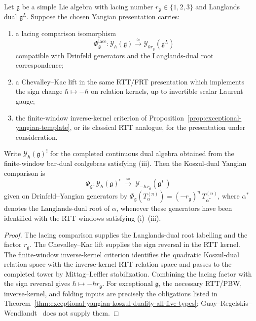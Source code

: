 \begin{theorem}
\label{thm:yangian-langlands-lacing}
Let $\mathfrak{g}$ be a simple Lie algebra with lacing number
$r_{\mathfrak{g}} \in \{1, 2, 3\}$ and Langlands dual $\mathfrak{g}^L$.
Suppose the chosen Yangian presentation carries:
\begin{enumerate}[label=\textup{(\roman*)}]
\item a lacing comparison isomorphism
\[
 \Phi_{\mathfrak{g}}^{\mathrm{lace}} :
 \mathcal{Y}_{\hbar}(\mathfrak{g})
 \xrightarrow{\;\simeq\;}
 \mathcal{Y}_{\hbar r_{\mathfrak{g}}}(\mathfrak{g}^L)
\]
compatible with Drinfeld generators and the Langlands-dual root
correspondence;
\item a Chevalley--Kac lift in the same RTT/FRT presentation which
implements the sign change \(\hbar\mapsto-\hbar\) on relation kernels,
up to invertible scalar Laurent gauge;
\item the finite-window inverse-kernel criterion of
Proposition~\ref{prop:exceptional-yangian-template}, or its classical
RTT analogue, for the presentation under consideration.
\end{enumerate}
Write $\mathcal{Y}_{\hbar}(\mathfrak{g})^{!}$ for the completed
continuous dual algebra obtained from the finite-window bar-dual
coalgebras satisfying \textup{(iii)}. Then the Koszul-dual Yangian
comparison is
\[
 \Phi_{\mathfrak{g}} :
 \mathcal{Y}_{\hbar}(\mathfrak{g})^{!}
 \;\xrightarrow{\;\simeq\;}\;
 \mathcal{Y}_{-\hbar\,r_{\mathfrak{g}}}(\mathfrak{g}^L)
\]
given on Drinfeld--Yangian generators by
$\Phi_{\mathfrak{g}}(T^{(n)}_{\alpha}) = (-r_{\mathfrak{g}})^n\,
T^{(n)}_{\alpha^*}$, where $\alpha^*$ denotes the Langlands-dual
root of $\alpha$, whenever these generators have been identified with
the RTT windows satisfying \textup{(i)}--\textup{(iii)}.
\end{theorem}

\begin{proof}
The lacing comparison supplies the Langlands-dual root labelling and
the factor \(r_{\mathfrak g}\). The Chevalley--Kac lift supplies the
sign reversal in the RTT kernel. The finite-window inverse-kernel
criterion identifies the quadratic Koszul-dual relation space with the
inverse-kernel RTT relation space and passes to the completed tower by
Mittag--Leffler stabilization. Combining the lacing factor with the
sign reversal gives \(\hbar\mapsto-\hbar r_{\mathfrak g}\). For
exceptional \(\mathfrak g\), the necessary RTT/PBW, inverse-kernel, and
folding inputs are precisely the obligations listed in
Theorem~\ref{thm:exceptional-yangian-koszul-duality-all-five-types};
Guay--Regelskis--Wendlandt~\cite{GRW18} does not supply them.
\end{proof}

